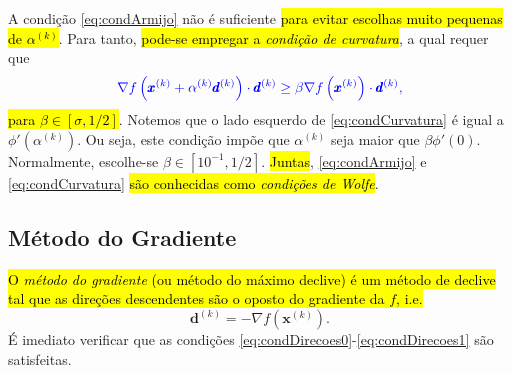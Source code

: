 A condição \eqref{eq:condArmijo} não é suficiente \hl{para evitar escolhas muito pequenas de $\alpha^{(k)}$}. Para tanto, \hl{pode-se empregar a \emph{condição de curvatura}}, a qual requer que
\begin{equation}\label{eq:condCurvatura}\color{blue}\nabla f\left(\pmb{x}^{(k)} + \alpha^{(k)}\pmb{d}^{(k)}\right)\cdot \pmb{d}^{(k)} \geq \beta\nabla f\left(\pmb{x}^{(k)}\right)\cdot\pmb{d}^{(k)},
\end{equation}
\hl{para $\beta\in [\sigma, 1/2]$}. Notemos que o lado esquerdo de \eqref{eq:condCurvatura} é igual a $\phi'(\alpha^{(k)})$. Ou seja, este condição impõe que $\alpha^{(k)}$ seja maior que $\beta\phi'(0)$. Normalmente, escolhe-se $\beta\in [10^{-1}, 1/2]$. \hl{Juntas}, \eqref{eq:condArmijo} e \eqref{eq:condCurvatura} \hl{são conhecidas como \emph{condições de Wolfe}}{\wolfe}.

\subsection{Método do Gradiente}
\badgeRevisar

\hl{O \emph{método do gradiente} (ou método do máximo declive) é um método de declive tal que as direções descendentes são o oposto do gradiente da $f$, i.e.}
\begin{equation}
  \pmb{d}^{(k)} = -\nabla f(\pmb{x}^{(k)}).
\end{equation}
É imediato verificar que as condições \eqref{eq:condDirecoes0}-\eqref{eq:condDirecoes1} são satisfeitas.

